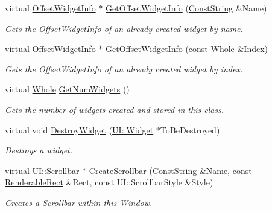 \begin{DoxyCompactItemize}
virtual \hyperlink{structphys_1_1UI_1_1ResizingInfo}{OffsetWidgetInfo} $\ast$ \hyperlink{classphys_1_1UI_1_1Window_a77a2091e41766344253cac55af650f54}{GetOffsetWidgetInfo} (\hyperlink{namespacephys_a5ce5049f8b4bf88d6413c47b504ebb31}{ConstString} \&Name)
\begin{DoxyCompactList}\small\item\em Gets the OffsetWidgetInfo of an already created widget by name. \item\end{DoxyCompactList}\item 
virtual \hyperlink{structphys_1_1UI_1_1ResizingInfo}{OffsetWidgetInfo} $\ast$ \hyperlink{classphys_1_1UI_1_1Window_aa3691702f83c0369c4e5b1cec317e656}{GetOffsetWidgetInfo} (const \hyperlink{namespacephys_a460f6bc24c8dd347b05e0366ae34f34a}{Whole} \&Index)
\begin{DoxyCompactList}\small\item\em Gets the OffsetWidgetInfo of an already created widget by index. \item\end{DoxyCompactList}\item 
virtual \hyperlink{namespacephys_a460f6bc24c8dd347b05e0366ae34f34a}{Whole} \hyperlink{classphys_1_1UI_1_1Window_a062270984d25dca44f0bc4d65ef324a0}{GetNumWidgets} ()
\begin{DoxyCompactList}\small\item\em Gets the number of widgets created and stored in this class. \item\end{DoxyCompactList}\item 
virtual void \hyperlink{classphys_1_1UI_1_1Window_ab4bda54a82b64aec2cf4e03201a40772}{DestroyWidget} (\hyperlink{classphys_1_1UI_1_1Widget}{UI::Widget} $\ast$ToBeDestroyed)
\begin{DoxyCompactList}\small\item\em Destroys a widget. \item\end{DoxyCompactList}\item 
virtual \hyperlink{classphys_1_1UI_1_1Scrollbar}{UI::Scrollbar} $\ast$ \hyperlink{classphys_1_1UI_1_1Window_af25f6535f3a785f779df43a7f01845e0}{CreateScrollbar} (\hyperlink{namespacephys_a5ce5049f8b4bf88d6413c47b504ebb31}{ConstString} \&Name, const \hyperlink{structphys_1_1UI_1_1RenderableRect}{RenderableRect} \&Rect, const UI::ScrollbarStyle \&Style)
\begin{DoxyCompactList}\small\item\em Creates a \hyperlink{classphys_1_1UI_1_1Scrollbar}{Scrollbar} within this \hyperlink{classphys_1_1UI_1_1Window}{Window}. \item\end{DoxyCompactList}\item 

\end{DoxyCompactItemize}

